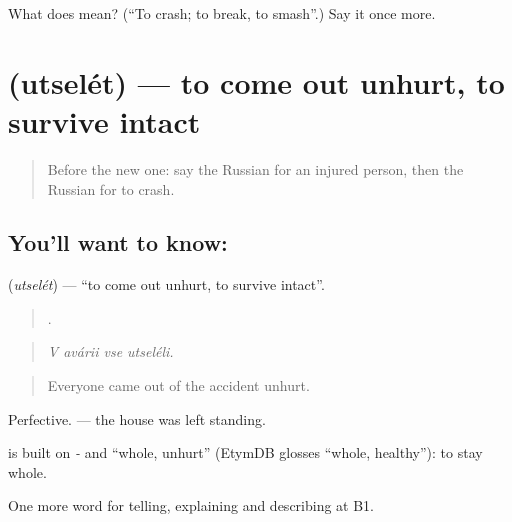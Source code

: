 \begin{tcolorbox}[breakable,colback=teal!4,colframe=teal!35!black,title={Before you move on}]
What does  mean? (\textquotedblleft{}To crash; to break, to smash\textquotedblright{}.) Say it once more.
\end{tcolorbox}
\section[\texorpdfstring{\ru{уцелеть} (utselét)}{уцелеть (utselét)}]{ (utselét) — to come out unhurt, to survive intact}

\label{lesson:RU-C298-utselet}



\begin{quote}
Before the new one: say the Russian for an injured person, then the Russian for to crash.
\end{quote}

\subsection*{You'll want to know: }
\textbf{} (\emph{utselét}) — \textquotedblleft{}to come out unhurt, to survive intact\textquotedblright{}.

\begin{quote}
   .
\end{quote}

\begin{quote}
\emph{V avárii vse utseléli.}
\end{quote}

\begin{quote}
Everyone came out of the accident unhurt.
\end{quote}

Perfective. \emph{ } — the house was left standing.

\begin{cousinweb}
\emph{} is built on \emph{-} and \emph{} \textquotedblleft{}whole, unhurt\textquotedblright{} (EtymDB glosses \emph{} \textquotedblleft{}whole, healthy\textquotedblright{}): to stay whole.
\end{cousinweb}

\begin{grammarlens}[title={What you've built}]
One more word for telling, explaining and describing at B1.
\end{grammarlens}

